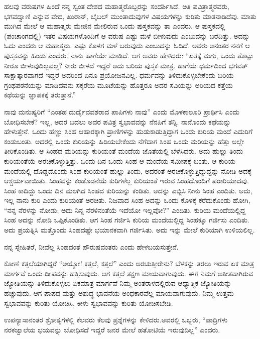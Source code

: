ಹಲವು ವರುಷಗಳ ಹಿಂದೆ ನನ್ನ ಸ್ವಂತ ದೇಶದ ಮಹಾತ್ಮರೊಬ್ಬರನ್ನು ಸಂದರ್ಶಿಸಿದೆ. ಅತಿ ಪವಿತ್ರಾತ್ಮರವರು, ಭಗವದ್ವಾಣಿ ಎನ್ನುವ ವೇದ, ಖುರಾನ್, ಬೈಬಲ್ ಮುಂತಾದು\-ವುಗಳ ವಿಷಯಗಳನ್ನು ಕುರಿತು ಮಾತನಾಡಿದೆವು. ಮಾತು ಮುಗಿದ ಮೇಲೆ ಆ ಮಹಾತ್ಮರು ಮೇಜಿನ ಮೇಲಿರುವ ಒಂದು ಪುಸ್ತಕವನ್ನು ತಾ ಎಂದರು. ಆ ಪುಸ್ತಕದಲ್ಲಿ (ಪಂಚಾಂಗದಲ್ಲಿ) ಇತರ ವಿಷಯಗಳೊಂದಿಗೆ ಆ ವರುಷ ಎಷ್ಟು ಮಳೆ ಬೀಳುವುದು ಎಂಬುದನ್ನು ಬರೆದಿತ್ತು. ಅದನ್ನು ಓದು ಎಂದರು ಆ ಮಹಾತ್ಮರು. ಎಷ್ಟು ಕೊಳಗ ಮಳೆ ಬರುವುದು ಎಂಬುದನ್ನು ಓದಿದೆ. ಅವರು ಅನಂತರ ನನಗೆ ಆ ಪುಸ್ತಕವನ್ನು ಹಿಂಡು ಎಂದರು. ನಾನು ಹಾಗೆಯೇ ಮಾಡಿದೆ. ಆಗ ಅವರು ಹೇಳಿದರು: “ಏತಕ್ಕೆ ಮಗು, ಒಂದು ತೊಟ್ಟು ನೀರೂ ಬೀಳುವುದಿಲ್ಲವಲ್ಲ? ನೀರು ಬೀಳದೆ ಇದ್ದರೆ ಅದು ಬರಿಯ ಪುಸ್ತಕ ಮಾತ್ರ. ಹಾಗೆಯೆ ಧರ್ಮದಿಂದ ಭಗವತ್ ಸಾಕ್ಷಾತ್ಕಾರವಾಗದೆ ಇದ್ದರೆ ಅದರಿಂದ ಏನೂ ಪ್ರಯೋಜನವಿಲ್ಲ. ಧರ್ಮವನ್ನು ತಿಳಿದುಕೊಳ್ಳಬೇಕೆಂದು ಬರಿಯ ಗ್ರಂಥಪಠನೆಯನ್ನು ಮಾಡಿದವನು ಸಕ್ಕರೆಯ ಮೂಟೆಯನ್ನು ಹೊತ್ತರೂ ಅದರ ಸವಿಯನ್ನು ಅರಿಯದ ಕತ್ತೆಯ ಕಥೆಯನ್ನು ಜ್ಞಾಪಕಕ್ಕೆ ತರುತ್ತಾನೆ.”

ನಾವು ಮನುಷ್ಯರಿಗೆ “ಎಂತಹ ದುರ್ದೈವವಶರಾದ ಪಾಪಿಗಳು ನಾವು'' ಎಂದು ಮೊಳಕಾಲೂರಿ ಪ್ರಾರ್ಥಿಸಿ ಎಂದು ಬೋಧಿಸಬೇಕೆ? ಇಲ್ಲ, ಅದರ ಬದಲು ಅವರ ಪವಿತ್ರ ಸ್ವಭಾವವನ್ನು ನೆನಪಿಗೆ ತನ್ನಿ. ನಾನೊಂದು ಕಥೆಯನ್ನು ಹೇಳುತ್ತೇನೆ. ಒಂದು ಹೆಣ್ಣು ಸಿಂಹ ಆಹಾರಕ್ಕಾಗಿ ಪ್ರಾಣಿಗಳನ್ನು ಹುಡುಕಾಡುತ್ತಿದ್ದಾಗ ಒಂದು ಕುರಿಯ ಮಂದೆ ಎದುರಿಗೆ ಕಂಡುಬಂತು. ಅದರಲ್ಲಿ ಒಂದು ಕುರಿಯನ್ನು ಹಿಡಿಯಬೇಕೆಂದು ನೆಗೆದಾಗ ಸಿಂಹ ಒಂದು ಮರಿಯನ್ನು ಹೆತ್ತು ಅಲ್ಲೇ ತೀರಿಕೊಂಡಿತು. ಆ ಸಿಂಹದ ಮರಿಯನ್ನು ಕುರಿಯಂತೆ ಮಂದೆಯ ಜೊತೆಯಲ್ಲಿ ಬೆಳೆಸಿದರು. ಅದು ಹುಲ್ಲು ತಿಂದು ಕುರಿಯಂತೆಯೆ ಅರಚಿಕೊಳ್ಳುತ್ತಿತ್ತು. ಒಂದು ದಿನ ಒಂದು ಸಿಂಹ ಆ ಮಂದೆಯ ಸಮೀಪಕ್ಕೆ ಬಂತು. ಆ ಕುರಿಯ ಮಂದೆಯಲ್ಲಿ ದೊಡ್ಡದೊಂದು ಸಿಂಹ ಕುರಿಯಂತೆ ಹುಲ್ಲು ತಿಂದು, ಅದರಂತೆ ಅರಚಿಕೊಳ್ಳುತ್ತಿದ್ದುದ್ದನ್ನು ನೋಡಿ ಅದಕ್ಕೆ ಆಶ್ಚರ್ಯವಾಯಿತು. ಸಿಂಹವನ್ನು ಕಂಡೊಡನೆಯೆ ಕುರಿಗಳೆಲ್ಲ ಕುರಿಯಂತೆ ಇರುವ ಸಿಂಹದೊಂದಿಗೆ ಪರಾರಿಯಾದವು. ಸಿಂಹ ಕಾದಿದ್ದು ಒಂದು ದಿನ ಮಲಗಿದ ಸಿಂಹದ ಕುರಿಯನ್ನು ಕಂಡಿತು. ಅದನ್ನು ಎಬ್ಬಿಸಿ ನೀನು ಸಿಂಹ ಎಂದಿತು. ಅದು, ಇಲ್ಲ ನಾನು ಕುರಿ ಎಂದು ಕುರಿಯಂತೆ ಅರಚಿತು. ನಿಜವಾದ ಸಿಂಹ ಅದನ್ನು ಒಂದು ಕೊಳಕ್ಕೆ ಕರೆದುಕೊಂಡು ಹೋಗಿ, “ನನ್ನ ನೆರಳನ್ನು ನೋಡು; ಅದು ನಿನ್ನ ನೆರಳಿನಂತೆಯೆ ಇದೆಯೋ ಇಲ್ಲವೋ?'' ಎಂದಿತು. ಕುರಿಯ ಮಂದೆಯಲ್ಲಿದ್ದ ಸಿಂಹ ಅದನ್ನು ನೋಡಿ ಒಪ್ಪಿಕೊಂಡಿತು. ಆಗ ಸಿಂಹ ಗರ್ಜಿಸಿ ಕುರಿಯ ಮಂದೆಯಲ್ಲಿದ್ದ ಸಿಂಹಕ್ಕೂ ಗರ್ಜಿಸು ಎಂದಿತು. ಅದು ಪ್ರಯತ್ನಿಸಿ ಮತ್ತೊಂದು ಸಿಂಹದಷ್ಟೇ ಭಯಾನಕವಾಗಿ ಗರ್ಜಿಸಿತು. ಅದು ಇನ್ನು ಮೇಲೆ ಕುರಿಯಾಗಿ ಉಳಿಯಲಿಲ್ಲ.

ನನ್ನ ಸ್ನೇಹಿತರೆ, ನೀವೆಲ್ಲ ಸಿಂಹದಂತೆ ಪೌರುಷವಂತರು ಎಂದು ಹೇಳಬಯಸುತ್ತೇನೆ.

ಕೋಣೆ ಕತ್ತಲೆಯಾಗಿದ್ದರೆ “ಅಯ್ಯೋ! ಕತ್ತಲೆ, ಕತ್ತಲೆ'' ಎಂದು ಅರಚುತ್ತೀರೇನು? ಬೆಳಕನ್ನು ತರಲು ಇರುವ ಏಕ ಮಾತ್ರ ಮಾರ್ಗವೆ ಒಂದು ದೀಪವನ್ನು ಹತ್ತಿಸುವುದು. ಆಗ ಕತ್ತಲೆ ತಕ್ಷಣ ಮಾಯವಾಗುವುದು. ಈಗ ನಿಮಗೆ ಅತೀತವಾಗಿರುವ ಜ್ಯೋತಿಯನ್ನು ತಿಳಿದುಕೊಳ್ಳಲು ಏಕಮಾತ್ರ ಮಾರ್ಗವೆ ನಿಮ್ಮ ಅಂತರಾಳದಲ್ಲಿರುವ ಆಧ್ಯಾತ್ಮಿಕ ಜ್ಯೋತಿಯನ್ನು ಹಚ್ಚುವುದು. ಆಗ ಪಾಪದ ಮತ್ತು ಅಶುದ್ಧ ಭಾವನೆಯ ಅಂಧಕಾರವೆಲ್ಲ ಮಾಯವಾಗುವುದು. ನಿಮ್ಮ ಉತ್ತಮ ಸ್ವಭಾವವನ್ನು ಕುರಿತು ಯೋಚಿಸಿ, ಕೀಳು ಸ್ವಭಾವವನ್ನು ಕುರಿತು ಯೋಚಿಸಬೇಡಿ.

\delimiter

ಉಪನ್ಯಾಸಾನಂತರ ಶ್ರೋತೃಗಳಲ್ಲಿ ಕೆಲವರು ಕೆಲವು ಪ್ರಶ್ನೆಗಳನ್ನು ಕೇಳಿದರು.\break ಅವರಲ್ಲಿ ಒಬ್ಬರು, “ಪಾದ್ರಿಗಳು ನರಕಜ್ವಾಲೆಯ ಭಯವನ್ನು ಬೋಧಿಸದೆ ಇದ್ದರೆ ಜನರ ಮೇಲೆ ಹತೋಟಿಯೆ ಇರುವುದಿಲ್ಲ” ಎಂದರು.


